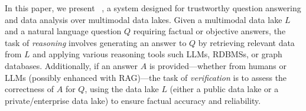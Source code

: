 

%

In this paper, we present \sys~\cite{symphony,verifai}, a system designed for trustworthy question answering and data analysis over multimodal data lakes. 
%
Given a multimodal data lake $L$ and a natural language question $Q$ requiring factual or objective answers, the task of {\em reasoning} involves generating an answer to $Q$ by retrieving relevant data from $L$ and applying various reasoning tools such LLMs, RDBMSs, or graph databases.
%
Additionally, if an answer $A$ is provided—whether from humans or LLMs (possibly enhanced with RAG)—the task of {\em verification} is to assess the correctness of $A$ for $Q$, using the data lake $L$ (either a public data lake or a private/enterprise data lake) to ensure factual accuracy and reliability.





